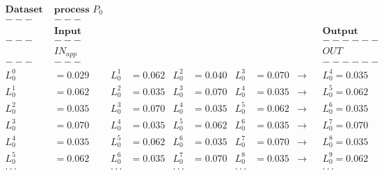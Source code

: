 {\small
\begin{align*}
\textbf{Dataset on } &\textbf{process $P_{0}$} \\
   ---&---	      	\\
&\textbf{Input}	& &	&	& & & & &	&\textbf{Output} \\
   ---&---  & & & &	& & & & &------	\\
	&IN_{app} & & & & & & & & &OUT    \\
   ---&---  & &	& & & & & & &------	\\
L^{0}_{0} &=0.029  &  L^{1}_{0} &=0.062  &  L^{2}_{0} &=0.040  &  L^{3}_{0} &=0.070	& \rightarrow &	 &L^{4}_{0} =0.035  \\
L^{1}_{0} &=0.062  &  L^{2}_{0} &=0.035  &  L^{3}_{0} &=0.070  &  L^{4}_{0} &=0.035	& \rightarrow &	 &L^{5}_{0} =0.062  \\
L^{2}_{0} &=0.035  &  L^{3}_{0} &=0.070  &  L^{4}_{0} &=0.035  &  L^{5}_{0} &=0.062	& \rightarrow &	 &L^{6}_{0} =0.035  \\
L^{3}_{0} &=0.070  &  L^{4}_{0} &=0.035  &  L^{5}_{0} &=0.062  &  L^{6}_{0} &=0.035	& \rightarrow &	 &L^{7}_{0} =0.070  \\
L^{4}_{0} &=0.035  &  L^{5}_{0} &=0.062  &  L^{6}_{0} &=0.035  &  L^{7}_{0} &=0.070	& \rightarrow &	 &L^{8}_{0} =0.035  \\
L^{5}_{0} &=0.062  &  L^{6}_{0} &=0.035  &  L^{7}_{0} &=0.070  &  L^{8}_{0} &=0.035	& \rightarrow &	 &L^{9}_{0} =0.062  \\
\cdot\cdot\cdot & & \cdot\cdot\cdot & & \cdot\cdot\cdot & & \cdot\cdot\cdot & & & & \cdot\cdot\cdot              
\end{align*}
}%

